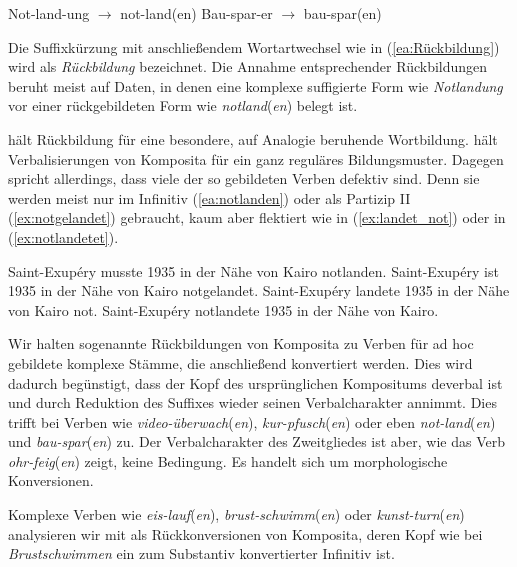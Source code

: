 \ea \label{ea:Rückbildung}
\ea \label{ea:Notland_en} Not-land-ung $\rightarrow$ not-land(en)
\ex \label{ex:Bauspar_en} Bau-spar-er $\rightarrow$ bau-spar(en)
\z 
\z 

Die Suffixkürzung mit anschließendem Wortartwechsel wie in (\ref{ea:Rückbildung}) wird als \textit{Rückbildung} bezeichnet. Die Annahme entsprechender Rückbildungen beruht meist auf Daten, in denen eine komplexe suffigierte Form wie \textit{Notlandung} vor einer rückgebildeten Form wie \textit{notland}(\textit{en}) belegt ist. 

\citet[95]{Erben2006_1975} hält Rückbildung für eine besondere, auf Analogie beruhende Wortbildung. \citet[144]{Echenlohr1999} hält Verbalisierungen von Komposita für ein ganz reguläres Bildungsmuster. Dagegen spricht allerdings, dass viele der so gebildeten Verben defektiv sind. Denn sie werden meist nur im Infinitiv (\ref{ea:notlanden}) oder als Partizip II (\ref{ex:notgelandet}) gebraucht, kaum aber flektiert wie in (\ref{ex:landet_not}) oder in (\ref{ex:notlandetet}).

\ea \label{notlanden}
\ea \label{ea:notlanden} Saint-Exupéry musste 1935 in der Nähe von Kairo notlanden.
\ex \label{ex:notgelandet} Saint-Exupéry ist 1935 in der Nähe von Kairo notgelandet.
\ex \label{ex:landet_not} Saint-Exupéry landete 1935 in der Nähe von Kairo not.
\ex \label{ex:notlandetet} Saint-Exupéry notlandete 1935 in der Nähe von Kairo.
\z 
\z 

Wir halten sogenannte Rückbildungen von Komposita zu Verben für ad hoc gebildete komplexe Stämme, die anschließend konvertiert werden. Dies wird dadurch begünstigt, dass der Kopf des ursprünglichen Kompositums deverbal ist und durch Reduktion des Suffixes wieder seinen Verbalcharakter annimmt. Dies trifft bei Verben wie \textit{video-überwach}(\textit{en}), \textit{kur-pfusch}(\textit{en}) oder eben \textit{not-land}(\textit{en}) und \textit{bau-spar}(\textit{en}) zu. Der Verbalcharakter des Zweitgliedes ist aber, wie das Verb \textit{ohr-feig}(\textit{en}) zeigt, keine Bedingung. Es handelt sich um morphologische Konversionen. 

Komplexe Verben wie \textit{eis-lauf}(\textit{en}), \textit{brust-schwimm}(\textit{en}) oder \textit{kunst-turn}(\textit{en}) analysieren wir mit \citet[245]{Eisenberg2020_Wort} als Rückkonversionen von Komposita, deren Kopf wie bei \textit{Brustschwimmen} ein zum Substantiv konvertierter Infinitiv ist. 

